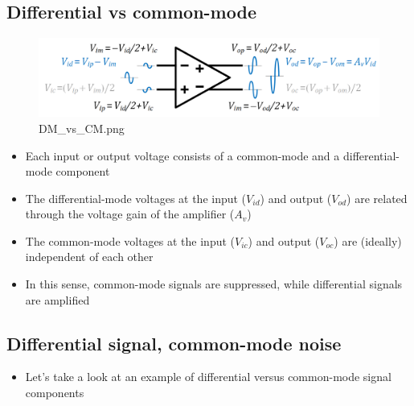 \documentclass[11pt]{article}
\providecommand{\tightlist}{%
      \setlength{\itemsep}{0pt}\setlength{\parskip}{0pt}}
\begin{document}
    \hypertarget{differential-vs-common-mode}{%
\subsection{Differential vs
common-mode}\label{differential-vs-common-mode}}

    \begin{figure}
\centering
\includegraphics{DM_vs_CM.png}
\caption{DM\_vs\_CM.png}
\end{figure}

    \begin{itemize}
\tightlist
\item
  Each input or output voltage consists of a common-mode and a
  differential-mode component
\item
  The differential-mode voltages at the input (\(V_{id}\)) and output
  (\(V_{od}\)) are related through the voltage gain of the amplifier
  (\(A_v\))
\item
  The common-mode voltages at the input (\(V_{ic}\)) and output
  (\(V_{oc}\)) are (ideally) independent of each other
\item
  In this sense, common-mode signals are suppressed, while differential
  signals are amplified
\end{itemize}

    \hypertarget{differential-signal-common-mode-noise}{%
\subsection{Differential signal, common-mode
noise}\label{differential-signal-common-mode-noise}}

    \begin{itemize}
\tightlist
\item
  Let's take a look at an example of differential versus common-mode
  signal components
\end{itemize}
\end{document}
